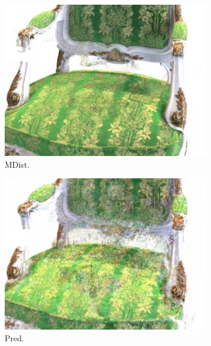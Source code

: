 \begin{figure}[ht!]
\begin{subfigure}{0.19\textwidth}
        \centering   
        \includegraphics[width=\linewidth]{figs/max_dist_chair.jpg}
          \caption{MDist.}
          \label{fig:sub2}
      \end{subfigure}
      \begin{subfigure}{0.19\textwidth}
        \centering   
        \includegraphics[width=\linewidth]{figs/uncertainty_chair.jpg}
          \caption{Pred.}
          \label{fig:sub2}
      \end{subfigure}
      \begin{subfigure}{0.19\textwidth}
        \centering   

\end{subfigure}
\end{figure}
